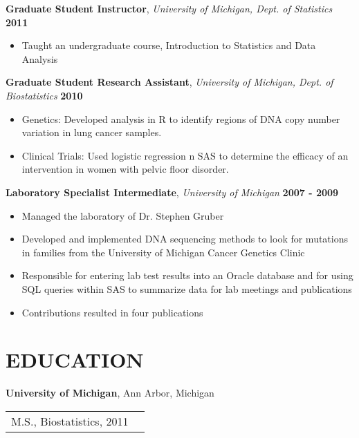 \documentclass{res}
\begin{document}
\begin{resume}
\textbf{Graduate Student Instructor}, \textit{University of Michigan, Dept. of Statistics} \hfill \textbf{2011}
\begin{itemize} \itemsep -2pt
\item Taught an undergraduate course, Introduction to Statistics and Data Analysis
\end{itemize}

\textbf{Graduate Student Research Assistant}, \textit{University of Michigan, Dept. of Biostatistics} \hfill \textbf{2010}
\begin{itemize} \itemsep -2pt
\item Genetics: Developed analysis in R to identify regions of DNA copy number variation in lung cancer samples. 
\item Clinical Trials: Used logistic regression n SAS to determine the efficacy of an intervention in women with pelvic floor disorder.  
\end{itemize}

\textbf{Laboratory Specialist Intermediate}, \textit{University of Michigan} \hfill \textbf{2007 - 2009}
\begin{itemize} \itemsep -2pt
\item Managed the laboratory of Dr. Stephen Gruber
\item Developed and implemented DNA sequencing methods to look for mutations in families from the University of Michigan Cancer Genetics Clinic
\item Responsible for entering lab test results into an Oracle database and for using SQL queries within SAS to summarize data for lab meetings and publications
\item Contributions resulted in four publications
\end{itemize}

\section{EDUCATION}
\vspace*{+0.2cm}
\textbf{University of Michigan}, Ann Arbor, Michigan\\
\begin{tabular}{ p{10cm} l } 
M.S., {Biostatistics}, 2011\\
\end{tabular}


\end{resume}
\end{document}
